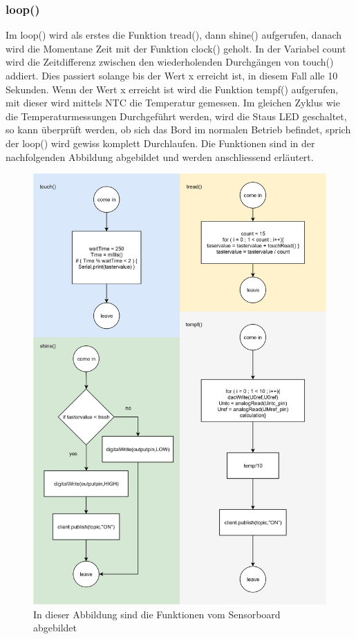 \subsubsection{loop()} \label{subsubsec: sensorloop}
Im loop() wird als erstes die Funktion tread(), dann shine() aufgerufen, danach wird die Momentane Zeit mit der Funktion clock() geholt. In der Variabel count wird die Zeitdifferenz zwischen den wiederholenden Durchgängen von touch() addiert. Dies passiert solange bis der Wert x erreicht ist, in diesem Fall alle 10 Sekunden. Wenn der Wert x erreicht ist wird die Funktion tempf() aufgerufen, mit dieser wird mittels NTC die Temperatur gemessen. Im gleichen Zyklus wie die Temperaturmessungen Durchgeführt werden, wird die Staus LED geschaltet, so kann überprüft werden, ob sich das Bord im normalen Betrieb befindet, sprich der loop() wird gewiss komplett Durchlaufen. Die Funktionen sind in der nachfolgenden Abbildung abgebildet und werden anschliessend erläutert.

\begin{figure}[H]
	\centering
	\includegraphics[width=\textwidth]{graphics/FunktionenSensor.png}
	\caption{In dieser Abbildung sind die Funktionen vom Sensorboard abgebildet}
	\label{pic: funktionen sensor}
\end{figure}   
